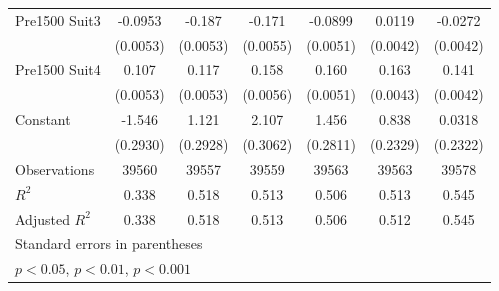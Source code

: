 {\begin{tabular}{l*{6}{c}}
\addlinespace
Pre1500 Suit3       &     -0.0953\sym{***}&      -0.187\sym{***}&      -0.171\sym{***}&     -0.0899\sym{***}&      0.0119\sym{**} &     -0.0272\sym{***}\\
                    &    (0.0053)         &    (0.0053)         &    (0.0055)         &    (0.0051)         &    (0.0042)         &    (0.0042)         \\
\addlinespace
Pre1500 Suit4       &       0.107\sym{***}&       0.117\sym{***}&       0.158\sym{***}&       0.160\sym{***}&       0.163\sym{***}&       0.141\sym{***}\\
                    &    (0.0053)         &    (0.0053)         &    (0.0056)         &    (0.0051)         &    (0.0043)         &    (0.0042)         \\
\addlinespace
Constant            &      -1.546\sym{***}&       1.121\sym{***}&       2.107\sym{***}&       1.456\sym{***}&       0.838\sym{***}&      0.0318         \\
                    &    (0.2930)         &    (0.2928)         &    (0.3062)         &    (0.2811)         &    (0.2329)         &    (0.2322)         \\
\midrule
Observations        &       39560         &       39557         &       39559         &       39563         &       39563         &       39578         \\
\(R^{2}\)           &       0.338         &       0.518         &       0.513         &       0.506         &       0.513         &       0.545         \\
Adjusted \(R^{2}\)  &       0.338         &       0.518         &       0.513         &       0.506         &       0.512         &       0.545         \\
\bottomrule
\multicolumn{7}{l}{\footnotesize Standard errors in parentheses}\\
\multicolumn{7}{l}{\footnotesize \sym{*} \(p<0.05\), \sym{**} \(p<0.01\), \sym{***} \(p<0.001\)}\\
\end{tabular}
}
